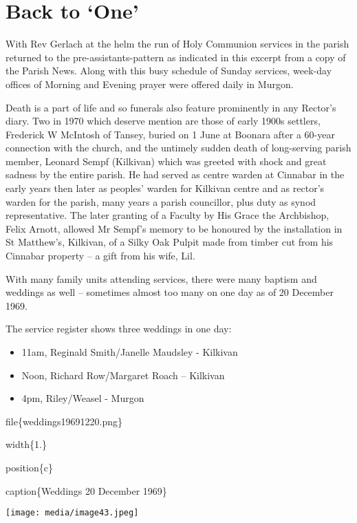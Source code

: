 \hypertarget{back-to-one}{%
\section{Back to `One'}\label{back-to-one}}

With Rev Gerlach at the helm the run of Holy Communion services in the parish returned to the pre-assistants-pattern as indicated in this excerpt from a copy of the Parish News. Along with this busy schedule of Sunday services, week-day offices of Morning and Evening prayer were offered daily in Murgon.

Death is a part of life and so funerals also feature prominently in any Rector's diary. Two in 1970 which deserve mention are those of early 1900s settlers, Frederick W McIntosh of Tansey, buried on 1 June at Boonara after a 60-year connection with the church, and the untimely sudden death of long-serving parish member, Leonard Sempf (Kilkivan) which was greeted with shock and great sadness by the entire parish. He had served as centre warden at Cinnabar in the early years then later as peoples' warden for Kilkivan centre and as rector's warden for the parish, many years a parish councillor, plus duty as synod representative. The later granting of a Faculty by His Grace the Archbishop, Felix Arnott, allowed Mr Sempf's memory to be honoured by the installation in St Matthew's, Kilkivan, of a Silky Oak Pulpit made from timber cut from his Cinnabar property -- a gift from his wife, Lil.

With many family units attending services, there were many baptism and weddings as well -- sometimes almost too many on one day as of 20 December 1969.

The service register shows three weddings in one day:

\begin{itemize}
\item
  11am, Reginald Smith/Janelle Maudsley - Kilkivan
\item
  Noon, Richard Row/Margaret Roach -- Kilkivan
\item
  4pm, Riley/Weasel - Murgon
\end{itemize}

file\{weddings19691220.png\}

width\{1.\}

position\{c\}

caption\{Weddings 20 December 1969\}

\texttt{[image: media/image43.jpeg]}

